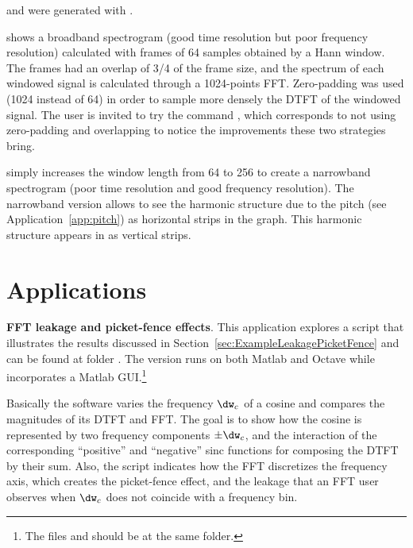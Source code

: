  and  were generated with .
	
 shows a broadband spectrogram (good time resolution but poor frequency resolution) calculated with frames of 64 samples obtained by a Hann window. The frames had an overlap of 3/4 of the frame size, and the spectrum of each windowed signal is calculated through a 1024-points FFT. Zero-padding was used (1024 instead of 64) in order to sample more densely the DTFT of the windowed signal. 
The user is invited to try the command , which corresponds to not using zero-padding and overlapping to notice the improvements these two strategies bring.

 simply increases the window length from 64 to 256 to create a narrowband spectrogram (poor time resolution and good frequency resolution). The narrowband version allows to see the harmonic structure due to the pitch (see Application~\ref{app:pitch}) as horizontal strips in the graph. This harmonic structure appears in  as vertical strips.

\section{Applications}
\bApplication \label{ex:fftLeakagePicketFence}\textbf{FFT leakage and picket-fence effects}.
This application explores a script that illustrates the results discussed in Section~\ref{sec:ExampleLeakagePicketFence} and can be found at folder . The version  runs on both Matlab and Octave while  incorporates a Matlab GUI.\footnote{The files  and  should be at the same folder.}

Basically the software varies the frequency $\dw_c$ of a cosine and compares the magnitudes of its DTFT and FFT. The goal is to show how the cosine is represented by two frequency components $\pm \dw_c$, and the interaction of the corresponding ``positive'' and ``negative'' sinc functions for composing the DTFT by their sum. Also, the script indicates how the FFT discretizes the frequency axis, which creates the picket-fence effect, and the leakage that an FFT user observes when $\dw_c$ does not coincide with a frequency bin.

